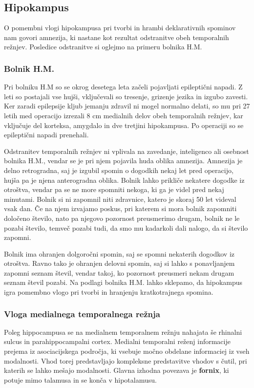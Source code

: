 \documentclass[10pt,a4paper]{article}
\begin{document}
\subsection{Hipokampus}
O pomembni vlogi hipokampusa pri tvorbi in hrambi deklarativnih spominov nam govori amnezija, ki nastane kot rezultat odstranitve obeh temporalnih režnjev. Posledice odstranitve si oglejmo na primeru bolnika H.M.

\subsubsection{Bolnik H.M.}
Pri bolniku H.M so se okrog desetega leta začeli pojavljati epileptični napadi. Z leti so postajali vse hujši, vključevali so tresenje, grizenje jezika in izgubo zavesti. Ker zaradi epilepsije kljub jemanju zdravil ni mogel normalno delati, so mu pri 27 letih med operacijo izrezali 8 cm medialnih delov obeh temporalnih režnjev, kar vključuje del korteksa, amygdalo in dve tretjini hipokampusa. Po operaciji so se epileptični napadi prenehali.

Odstranitev temporalnih režnjev ni vplivala na zavedanje, inteligenco ali osebnost bolnika H.M., vendar se je pri njem pojavila huda oblika amnezija. Amnezija je delno retrogradna, saj je izgubil spomin o dogodkih nekaj let pred operacijo, hujša pa je njena anterogradna oblika. Bolnik lahko prikliče nekatere dogodke iz otroštva, vendar pa se ne more spomniti nekoga, ki ga je videl pred nekaj minutami. Bolnik si ni zapomnil niti zdravnice, katero je skoraj 50 let videval vsak dan. Če na njem izvajamo poskus, pri katerem si mora bolnik zapomniti določeno število, nato pa njegovo pozornost preusmerimo drugam, bolnik ne le pozabi število, temveč pozabi tudi, da smo mu kadarkoli dali nalogo, da si število zapomni.

Bolnik ima ohranjen dolgoročni spomin, saj se spomni nekaterih dogodkov iz otroštva. Ravno tako je ohranjen delovni spomin, saj si lahko s ponavljanjem zapomni seznam števil, vendar takoj, ko pozornost preusmeri nekam drugam seznam števil pozabi. Na podlagi bolnika H.M. lahko sklepamo, da hipokampus igra pomembno vlogo pri tvorbi in hranjenju kratkotrajnega spomina.

\subsubsection{Vloga medialnega temporalnega režnja}
Poleg hippocampusa se na medialnem temporalnem režnju nahajata še rhinalni sulcus in parahippocampalni cortex. Medialni temporalni reženj informacije prejema iz asociacijskega področja, ki vsebuje močno obdelane informaciej iz vseh modalnosti. Vhod torej predstavljajo kompleksne predstavitve vhodov s čutil, pri katerih se lahko mešajo modalnosti. Glavna izhodna povezava je {\bf fornix}, ki potuje mimo talamusa in se konča v hipotalamusu.
\end{document}

